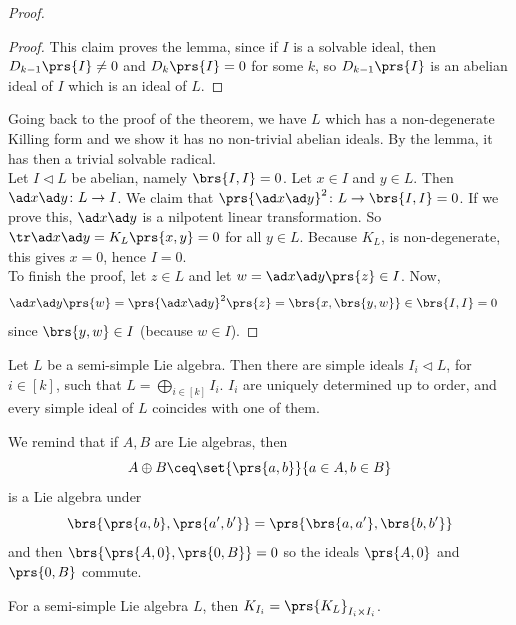 \documentclass[10pt,a4paper,twoside,openany,hidelinks]{book}
\begin{document}
\begin{proof}
\begin{proof}
This claim proves the lemma, since if $I$ is a solvable ideal, then $D_{k-1}\prs{I} \neq 0$ and $D_k\prs{I} = 0$ for some $k$, so $D_{k-1}\prs{I}$ is an abelian ideal of $I$ which is an ideal of $L$.
\end{proof}%

Going back to the proof of the theorem, we have $L$ which has a non-degenerate Killing form and we show it has no non-trivial abelian ideals. By the lemma, it has then a trivial solvable radical.
\\
Let $I \triangleleft L$ be abelian, namely $\brs{I,I} = 0$. Let $x \in I$ and $y \in L$. Then $\ad x \ad y \colon L \to I$.
We claim that $\prs{\ad x \ad y}^2 \colon L \to \brs{I,I} = 0$. If we prove this, $\ad x \ad y$ is a nilpotent linear transformation. So $\tr \ad x \ad y = K_L\prs{x,y} = 0$ for all $y \in L$. Because $K_L$, is non-degenerate, this gives $x = 0$, hence $I = 0$.
\\
To finish the proof, let $z \in L$ and let $w = \ad x \ad y \prs{z} \in I$. Now,
\begin{align*}
\ad x \ad y\prs{w} &= \prs{\ad x \ad y}^2 \prs{z} = \brs{x, \brs{y,w}} \in \brs{I, I} = 0
\end{align*}
since $\brs{y,w} \in I$ (because $w \in I$).
\end{proof}%

\begin{theorem}
Let $L$ be a semi-simple Lie algebra. Then there are simple ideals $I_i \triangleleft L$, for $i \in [k]$, such that $L = \bigoplus_{i\in[k]}I_i$. $I_i$ are uniquely determined up to order, and every simple ideal of $L$ coincides with one of them.
\end{theorem}

We remind that if $A,B$ are Lie algebras, then \[A \oplus B \ceq \set{\prs{a,b}}{a\in A, b\in B}\] is a Lie algebra under \[\brs{\prs{a,b},\prs{a',b'}} = \prs{\brs{a,a'},\brs{b,b'}}\]
and then $\brs{\prs{A,0},\prs{0,B}} = 0$ so the ideals $\prs{A,0}$ and $\prs{0,B}$ commute. 

\begin{remark}
For a semi-simple Lie algebra $L$, then $K_{I_i} = \prs{K_L}_{I_i \times I_i}$.
\end{remark}
\end{document}
